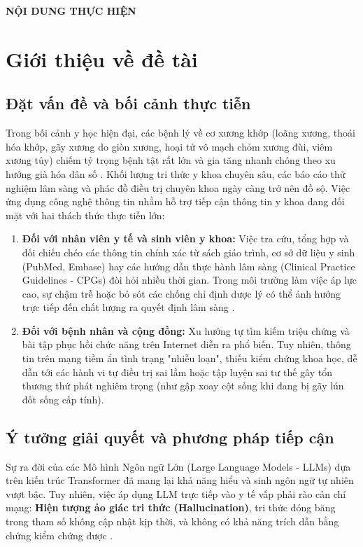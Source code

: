 \documentclass[12pt,a4paper]{article}
\begin{document}
\noindent\textbf{NỘI DUNG THỰC HIỆN}

\section{Giới thiệu về đề tài}

\subsection{Đặt vấn đề và bối cảnh thực tiễn}
Trong bối cảnh y học hiện đại, các bệnh lý về cơ xương khớp (loãng xương, thoái hóa khớp, gãy xương do giòn xương, hoại tử vô mạch chỏm xương đùi, viêm xương tủy) chiếm tỷ trọng bệnh tật rất lớn và gia tăng nhanh chóng theo xu hướng già hóa dân số \cite{who2022musculoskeletal}. Khối lượng tri thức y khoa chuyên sâu, các báo cáo thử nghiệm lâm sàng và phác đồ điều trị chuyên khoa ngày càng trở nên đồ sộ. Việc ứng dụng công nghệ thông tin nhằm hỗ trợ tiếp cận thông tin y khoa đang đối mặt với hai thách thức thực tiễn lớn:
\begin{enumerate}[label=(\alph*), leftmargin=1.27cm]
    \item \textbf{Đối với nhân viên y tế và sinh viên y khoa:} Việc tra cứu, tổng hợp và đối chiếu chéo các thông tin chính xác từ sách giáo trình, cơ sở dữ liệu y sinh (PubMed, Embase) hay các hướng dẫn thực hành lâm sàng (Clinical Practice Guidelines - CPGs) đòi hỏi nhiều thời gian. Trong môi trường làm việc áp lực cao, sự chậm trễ hoặc bỏ sót các chống chỉ định dược lý có thể ảnh hưởng trực tiếp đến chất lượng ra quyết định lâm sàng \cite{ortho_rag_13}.
    \item \textbf{Đối với bệnh nhân và cộng đồng:} Xu hướng tự tìm kiếm triệu chứng và bài tập phục hồi chức năng trên Internet diễn ra phổ biến. Tuy nhiên, thông tin trên mạng tiềm ẩn tình trạng "nhiễu loạn", thiếu kiểm chứng khoa học, dễ dẫn tới các hành vi tự điều trị sai lầm hoặc tập luyện sai tư thế gây tổn thương thứ phát nghiêm trọng (như gập xoay cột sống khi đang bị gãy lún đốt sống cấp tính).
\end{enumerate}

\subsection{Ý tưởng giải quyết và phương pháp tiếp cận}
Sự ra đời của các Mô hình Ngôn ngữ Lớn (Large Language Models - LLMs) dựa trên kiến trúc Transformer \cite{vaswani2017} đã mang lại khả năng hiểu và sinh ngôn ngữ tự nhiên vượt bậc. Tuy nhiên, việc áp dụng LLM trực tiếp vào y tế vấp phải rào cản chí mạng: \textbf{Hiện tượng ảo giác tri thức (Hallucination)}, tri thức đóng băng trong tham số không cập nhật kịp thời, và không có khả năng trích dẫn bằng chứng kiểm chứng được \cite{singhal2023expert, nist_ai_100_2e2025}.
\end{document}
